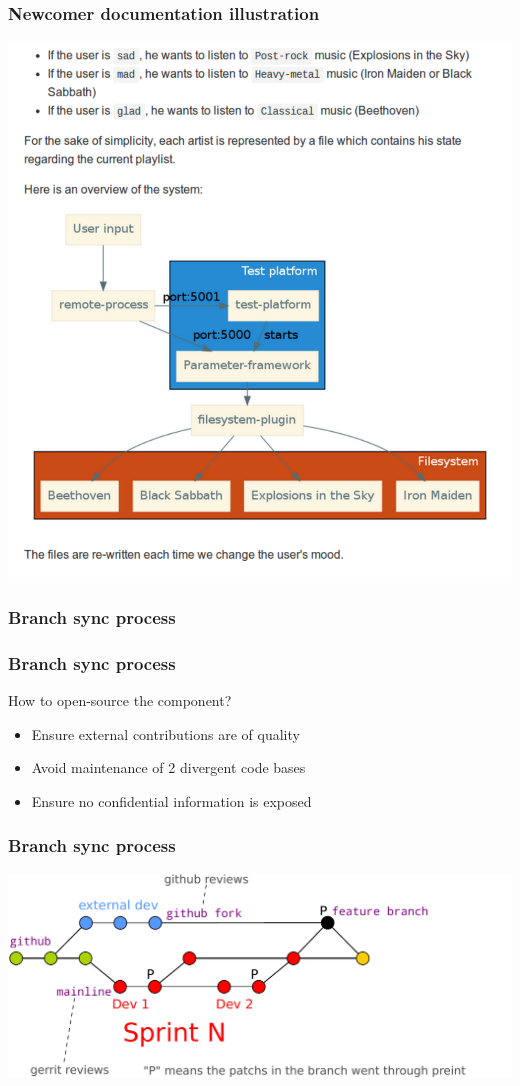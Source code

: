 \begin{frame}
    \frametitle{Newcomer documentation illustration}
    \centering
    \includegraphics[height=0.85\textheight]{../../report/src/img/tutos.pdf}
\end{frame}

\subsubsection{Branch sync process}
\begin{frame}
    \frametitle{Branch sync process}
    \begin{block}{How to open-source the component?}
        \begin{itemize}
            \item Ensure external contributions are of quality
            \item Avoid maintenance of 2 divergent code bases
            \item Ensure no confidential information is exposed
        \end{itemize}
    \end{block}
\end{frame}

\begin{frame}
    \frametitle{Branch sync process}
    \centering
    \includegraphics[width=\textwidth]{../../report/src/img/branches-process.pdf}
\end{frame}

